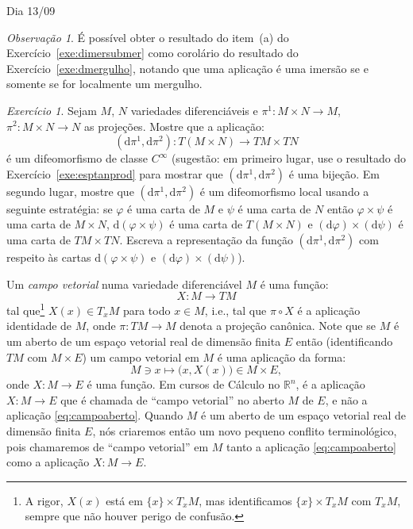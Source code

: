 \documentclass[oneside,11pt]{amsart}
\newcommand{\R}{\mathds R}
\newcommand{\dd}{\mathrm d}
\theoremstyle{remark}\newtheorem{exercise}{Exercício}[section]
\theoremstyle{plain}\newtheorem{teo}{Teorema}[section]
\theoremstyle{plain}\newtheorem{lem}[teo]{Lema}
\theoremstyle{plain}\newtheorem{prop}[teo]{Proposição}
\theoremstyle{definition}\newtheorem{defin}[teo]{Definição}
\theoremstyle{remark}\newtheorem{rem}[teo]{Observação}
\theoremstyle{definition}\newtheorem{example}[teo]{Exemplo}
\numberwithin{equation}{section}
\begin{document}
\begin{section}{Dia 13/09}
\begin{rem}
É possível obter o resultado do item~(a) do Exercício~\ref{exe:dimersubmer} como corolário do resultado do Exercício~\ref{exe:dmergulho}, notando
que uma aplicação é uma imersão se e somente se for localmente um mergulho.
\end{rem}

\begin{exercise}\label{exe:TMNTMTN}
Sejam $M$, $N$ variedades diferenciáveis e $\pi^1:M\times N\to M$, $\pi^2:M\times N\to N$ as projeções. Mostre que a aplicação:
\[(\dd\pi^1,\dd\pi^2):T(M\times N)\longrightarrow TM\times TN\]
é um difeomorfismo de classe $C^\infty$ (sugestão: em primeiro lugar, use o resultado do Exercício~\ref{exe:esptanprod} para mostrar que
$(\dd\pi^1,\dd\pi^2)$ é uma bijeção. Em segundo lugar, mostre que $(\dd\pi^1,\dd\pi^2)$ é um difeomorfismo local usando a seguinte estratégia:
se $\varphi$ é uma carta de $M$ e $\psi$ é uma carta de $N$ então $\varphi\times\psi$ é uma carta
de $M\times N$, $\dd(\varphi\times\psi)$ é uma carta de $T(M\times N)$ e $(\dd\varphi)\times(\dd\psi)$ é uma carta de $TM\times TN$. Escreva a representação
da função $(\dd\pi^1,\dd\pi^2)$ com respeito às cartas $\dd(\varphi\times\psi)$ e $(\dd\varphi)\times(\dd\psi)$).
\end{exercise}

Um {\em campo vetorial\/} numa variedade diferenciável $M$ é uma função:
\[X:M\longrightarrow TM\]
tal que\footnote{%
A rigor, $X(x)$ está em $\{x\}\times T_xM$, mas identificamos $\{x\}\times T_xM$ com $T_xM$, sempre que não houver perigo de confusão.}
$X(x)\in T_xM$ para todo $x\in M$, i.e., tal que
$\pi\circ X$ é a aplicação identidade de $M$, onde $\pi:TM\to M$ denota a projeção canônica.
Note que se $M$ é um aberto de um espaço vetorial real de dimensão finita $E$ então (identificando $TM$ com $M\times E$) um campo vetorial
em $M$ é uma aplicação da forma:
\begin{equation}\label{eq:campoaberto}
M\ni x\longmapsto\big(x,X(x)\big)\in M\times E,
\end{equation}
onde $X:M\to E$ é uma função. Em cursos de Cálculo no $\R^n$, é a aplicação $X:M\to E$ que é chamada de ``campo vetorial'' no aberto $M$ de $E$,
e não a aplicação \eqref{eq:campoaberto}. Quando $M$ é um aberto de um espaço vetorial real de dimensão finita $E$, nós criaremos então um novo
pequeno conflito terminológico, pois chamaremos de ``campo vetorial'' em $M$ tanto a aplicação \eqref{eq:campoaberto} como a aplicação $X:M\to E$.


\end{section}
\end{document}

